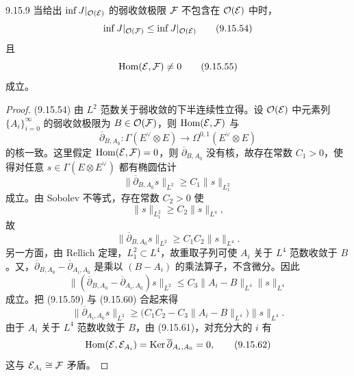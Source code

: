 \begin{lemma*}{9.15.9}
  当给出 $\inf J|_{\mathcal{O}(\mathcal{E})}$ 的弱收敛极限 $\mathcal{F}$ 不包含在 $\mathcal{O}(\mathcal{E})$ 中时，
  \begin{equation}
    \inf J|_{\mathcal{O}(\mathcal{F})}\le\inf J|_{\mathcal{O}(\mathcal{E})}
    \tag{9.15.54}
  \end{equation}
  且
  \begin{equation}
    \operatorname{Hom}(\mathcal{E},\mathcal{F})\ne0
    \tag{9.15.55}
  \end{equation}
  成立。
\end{lemma*}
\begin{proof}
  (9.15.54) 由 $L^2$ 范数关于弱收敛的下半连续性立得。设 $\mathcal{O}(\mathcal{E})$ 中元素列 $\{A_i\}_{i=0}^\infty$ 的弱收敛极限为 $B\in\mathcal{O}(\mathcal{F})$，则 $\operatorname{Hom}(\mathcal{E},\mathcal{F})$ 与
  \begin{equation}
    \overline{\partial}_{B,A_0}\colon\Gamma(E^\vee\otimes E)\to\Omega^{0,1}(E^\vee\otimes E)
    \tag{9.15.56}
  \end{equation}
  的核一致。这里假定 $\operatorname{Hom}(\mathcal{E},\mathcal{F})=0$，则 $\overline{\partial}_{B,A_0}$ 没有核，故存在常数 $C_1>0$，使得对任意 $s\in\Gamma(E\otimes E^\vee)$ 都有椭圆估计
  \begin{equation}
    \|\overline{\partial}_{B,A_0}s\|_{L^2}\ge C_1\|s\|_{L^2_1}
    \tag{9.15.57}
  \end{equation}
  成立。由 Sobolev 不等式，存在常数 $C_2>0$ 使
  \begin{equation}
    \|s\|_{L^2_1}\ge C_2\|s\|_{L^4},
    \tag{9.15.58}
  \end{equation}
  故
  \begin{equation}
    \|\overline{\partial}_{B,A_0}s\|_{L^2}\ge C_1C_2\|s\|_{L^4}.
    \tag{9.15.59}
  \end{equation}
  另一方面，由 Rellich 定理，$L^2_1\subset L^4$，故重取子列可使 $A_i$ 关于 $L^4$ 范数收敛于 $B$。又，$\overline{\partial}_{B,A_0}-\overline{\partial}_{A_i,A_0}$ 是乘以 $(B-A_i)$ 的乘法算子，不含微分。因此
  \begin{equation}
    \bigl\|(\overline{\partial}_{B,A_0}-\overline{\partial}_{A_i,A_0})s\bigr\|_{L^2}
    \le C_3\|A_i-B\|_{L^4}\|s\|_{L^4}
    \tag{9.15.60}
  \end{equation}
  成立。把 (9.15.59) 与 (9.15.60) 合起来得
  \begin{equation}
    \|\overline{\partial}_{A_i,A_0}s\|_{L^2}
    \ge\bigl(C_1C_2-C_3\|A_i-B\|_{L^4}\bigr)\|s\|_{L^4}.
    \tag{9.15.61}
  \end{equation}
  由于 $A_i$ 关于 $L^4$ 范数收敛于 $B$，由 (9.15.61)，对充分大的 $i$ 有
  \begin{equation}
    \operatorname{Hom}(\mathcal{E},\mathcal{E}_{A_i})=\operatorname{Ker}\overline{\partial}_{A_i,A_0}=0,
    \tag{9.15.62}
  \end{equation}
  这与 $\mathcal{E}_{A_i}\cong\mathcal{F}$ 矛盾。
\end{proof}
